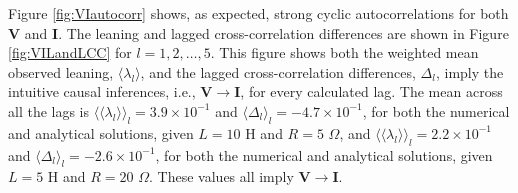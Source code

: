 \documentclass{article}[10pt]
\begin{document}
Figure \ref{fig:VIautocorr} shows, as expected, strong cyclic autocorrelations for both $\mathbf{V}$ and $\mathbf{I}$.  The leaning and lagged cross-correlation differences are shown in Figure \ref{fig:VILandLCC} for $l=1,2,\ldots,5$.  This figure shows both the weighted mean observed leaning, $\langle \lambda_l\rangle$, and the lagged cross-correlation differences, $\Delta_l$, imply the intuitive causal inferences, i.e., $\mathbf{V}\rightarrow\mathbf{I}$, for every calculated lag.  The mean across all the lags is $\langle\langle\lambda_l\rangle\rangle_l=3.9\times 10^{-1}$ and $\langle\Delta_l\rangle_l=-4.7\times 10^{-1}$, for both the numerical and analytical solutions, given $L=10$ H and $R=5$ $\Omega$, and $\langle\langle\lambda_l\rangle\rangle_l=2.2\times 10^{-1}$ and $\langle\Delta_l\rangle_l=-2.6\times 10^{-1}$, for both the numerical and analytical solutions, given $L=5$ H and $R=20$ $\Omega$.  These values all imply $\mathbf{V}\rightarrow\mathbf{I}$.  
\end{document}
